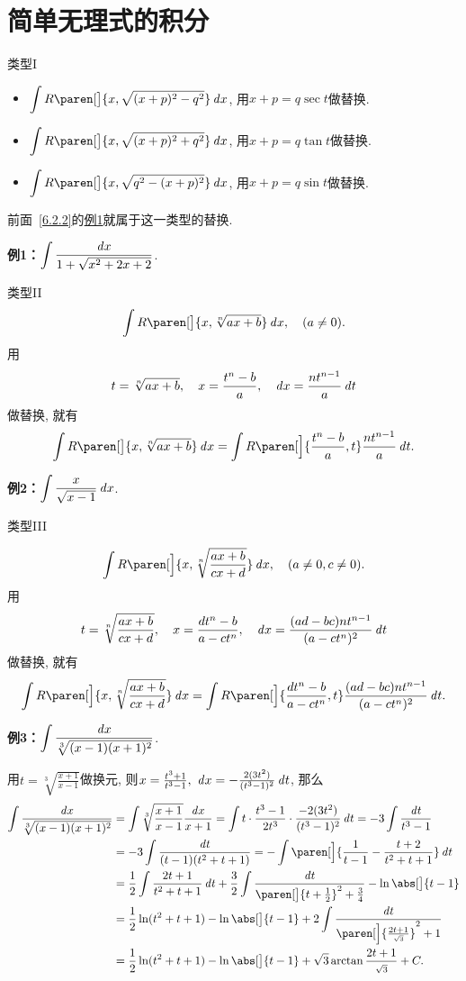 \documentclass[a4paper,punct=CCT]{ctexbook}
\newcommand*{\ex}[2]{\textbf{例#1：}#2}
\newcommand*{\disp}[1]{\( \displaystyle #1 \)}
\newcommand*{\exds}[2]{\ex{#1}\disp{#2}}
\theoremstyle{definition}
\theoremstyle{remark}
\begin{document}
\section{简单无理式的积分\label{6.5}}

类型I

\begin{itemize}
\item \(\displaystyle \int R\paren[\big]{x, \sqrt{(x+p)^2 - q^2}} \dx\), 用\(x + p = q \sec t\)做替换.
\item \(\displaystyle \int R\paren[\big]{x, \sqrt{(x+p)^2 + q^2}} \dx\), 用\(x + p = q \tan t\)做替换.
\item \(\displaystyle \int R\paren[\big]{x, \sqrt{q^2 - (x+p)^2}} \dx\), 用\(x + p = q \sin t\)做替换.
\end{itemize}

前面~\ref{6.2.2}的\hyperlink{eg:sinsub}{例1}就属于这一类型的替换.

\exds{1}{\int \frac{\dx}{1+\sqrt{x^2+2x+2}}}.

类型II
\[
  \int R\paren[\big]{x, \sqrt[n]{ax+b}} \dx, \quad (a \ne 0).
\]
用
\[
  t = \sqrt[n]{ax+b}, \quad
  x = \frac{t^n-b}{a}, \quad
  \mathop{}\!\mathit{d} x = \frac{nt^{n-1}}{a} \mathop{}\!\mathit{d} t
\]
做替换, 就有
\[
  \int R\paren[\big]{x, \sqrt[n]{ax+b}} \dx
  = \int R\paren[\Big]{\frac{t^n-b}{a}, t} \frac{nt^{n-1}}{a} \dt.
\]

\exds{2}{\int \frac{x}{\sqrt{x-1}} \dx}.

类型III

\[
  \int R\paren[\Big]{x, \sqrt[n]{\frac{ax+b}{cx+d}}} \dx, \quad (a \ne 0, c \ne 0).
\]
用
\[
  t = \sqrt[n]{\frac{ax+b}{cx+d}}, \quad
  x = \frac{dt^n-b}{a-ct^n}, \quad
  \mathop{}\!\mathit{d} x = \frac{(ad-bc)nt^{n-1}}{(a-ct^n)^2} \mathop{}\!\mathit{d} t
\]
做替换, 就有
\[
  \int R\paren[\Big]{x, \sqrt[n]{\frac{ax+b}{cx+d}}} \dx
  = \int R\paren[\Big]{\frac{dt^n-b}{a-ct^n}, t} \frac{(ad-bc)nt^{n-1}}{(a-ct^n)^2} \dt.
\]

\hypertarget{eg:rootI}{}
\exds{3}{\int \frac{\dx}{\sqrt[3]{(x-1)(x+1)^2}}}.

用\(t = \sqrt[3]{\frac{x+1}{x-1}}\)做换元, 则\(x = \frac{t^3+1}{t^3-1},\ \mathop{}\!\mathit{d} x = -\frac{2(3t^2)}{(t^3-1)^2} \mathop{}\!\mathit{d} t\), 那么
\[
  \begin{split}
    \int \frac{\dx}{\sqrt[3]{(x-1)(x+1)^2}}
    &= \int \sqrt[3]{\frac{x+1}{x-1}} \frac{\dx}{x+1}
    = \int t \cdot \frac{t^3-1}{2t^3} \cdot \frac{-2(3t^2)}{(t^3-1)^2} \dt
    = -3 \int \frac{\dt}{t^3-1} \\
    &= -3 \int \frac{\dt}{(t-1)(t^2+t+1)}
    = - \int \paren[\Big]{\frac{1}{t-1} - \frac{t+2}{t^2+t+1}} \dt \\
    &= \frac12 \int \frac{2t+1}{t^2+t+1} \dt + \frac32 \int \frac{\dt}{\paren[\big]{t+\frac12}^2+\frac34} - \ln\abs[\big]{t-1} \\
    &= \frac12 \ln(t^2+t+1) - \ln\abs[\big]{t-1} + 2 \int \frac{\dt}{\paren[\Big]{\frac{2t+1}{\scriptscriptstyle\sqrt3}}^2 + 1} \\
    &= \frac12 \ln(t^2+t+1) - \ln\abs[\big]{t-1} + \sqrt3 \arctan \frac{2t+1}{\scriptstyle\sqrt3} + C.
  \end{split}
\]
\end{document}
